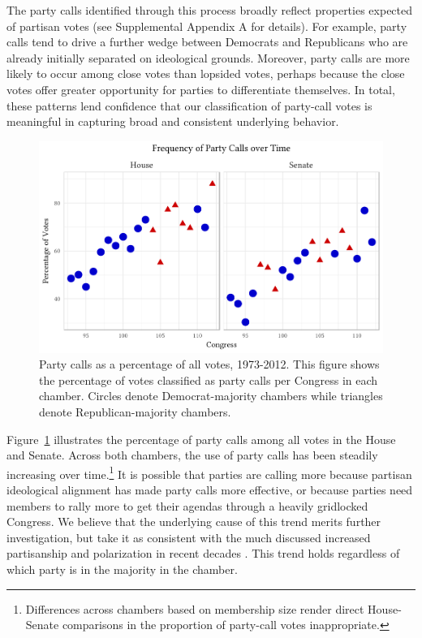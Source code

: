 \documentclass[12pt]{article}
\begin{document}
The party calls identified through this process broadly reflect properties expected of partisan votes (see Supplemental Appendix A for details).  For example, party calls tend to drive a further wedge between Democrats and Republicans who are already initially separated on ideological grounds.  Moreover, party calls are more likely to occur among close votes than lopsided votes, perhaps because the close votes offer greater opportunity for parties to differentiate themselves.  In total, these patterns lend confidence that our classification of party-call votes is meaningful in capturing broad and consistent underlying behavior.

\begin{figure}[t]
\centering
\includegraphics{party-calls-over-time.pdf}
\caption{Party calls as a percentage of all votes, 1973-2012.
This figure shows the percentage of votes classified as party calls per Congress in each chamber. Circles denote Democrat-majority chambers while triangles denote Republican-majority chambers.
\label{fig-party-calls-over-time}}
\end{figure}

Figure~\ref{fig-party-calls-over-time} illustrates the percentage of party calls among all votes in the House and Senate.  Across both chambers, the use of party calls has been steadily increasing over time.\footnote{\doublespacing\normalsize
Differences across chambers based on membership size render
direct House-Senate comparisons in the proportion of party-call votes
inappropriate.
}  It is possible that parties are calling more because partisan ideological alignment has made party calls more effective, or because parties need members to rally more to get their agendas through a heavily gridlocked Congress.  We believe that the underlying cause of this trend merits further investigation, but take it as consistent with the much discussed increased partisanship and polarization in recent decades \citep[e.g.,][]{Aldrich:2000, Lee:2009, Lee:2016, Theriault:2013, Smith:2014}. This trend holds regardless of which party is in the majority in the chamber.
\end{document}
